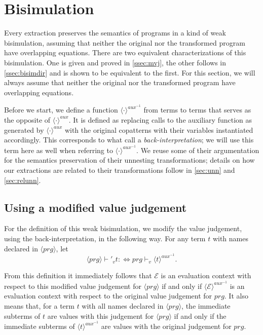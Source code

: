 \section{Bisimulation}
\label{sec:extrbis}

Every extraction preserves the semantics of programs in a kind of weak bisimulation, assuming that neither the original nor the transformed program have overlapping equations. There are two equivalent characterizations of this bisimulation. One is given and proved in \autoref{ssec:mvj}, the other follows in \autoref{ssec:bisimdir} and is shown to be equivalent to the first. For this section, we will always assume that neither the original nor the transformed program have overlapping equations.

Before we start, we define a function $\langle \cdot \rangle^{aux^{-1}}$ from terms to terms that serves as the opposite of $\langle \cdot \rangle^{aux}$. It is defined as replacing calls to the auxiliary function as generated by $\langle \cdot \rangle^{aux}$ with the original copatterns with their variables instantiated accordingly. This corresponds to what \citet{setzer14unnesting} call a \textit{back-interpretation}; we will use this term here as well when referring to $\langle \cdot \rangle^{aux^{-1}}$. We reuse some of their argumentation for the semantics preservation of their unnesting transformations; details on how our extractions are related to their transformations follow in \autoref{sec:unn} and \autoref{sec:relunn}.

\subsection{Using a modified value judgement}
\label{ssec:mvj}

For the definition of this weak bisimulation, we modify the value judgement, using the back-interpretation, in the following way. For any term $t$ with names declared in $\langle prg \rangle$, let
\[
\langle prg \rangle \vdash'_v t :\iff prg \vdash_v \langle t \rangle^{aux^{-1}}.
\]

From this definition it immediately follows that $\mathcal{E}$ is an evaluation context with respect to this modified value judgement for $\langle prg \rangle$ if and only if $\langle \mathcal{E} \rangle^{aux^{-1}}$ is an evaluation context with respect to the original value judgement for $prg$. It also means that, for a term $t$ with all names declared in $\langle prg \rangle$, the immediate subterms of $t$ are values with this judgement for $\langle prg \rangle$ if and only if the immediate subterms of $\langle t \rangle^{aux^{-1}}$ are values with the original judgement for $prg$.

